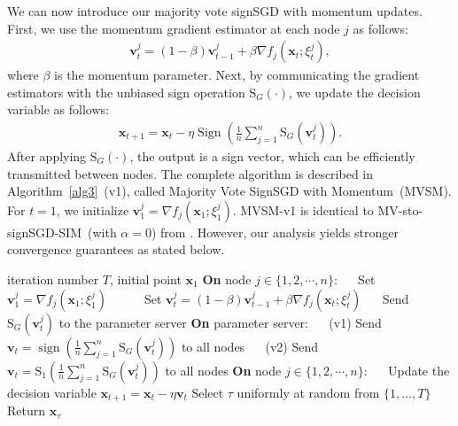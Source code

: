 \documentclass{article}
\def \v {\mathbf{v}}
\def \x {\mathbf{x}}
\def \x {\mathbf{x}}
\def \v {\mathbf{v}}
\begin{document}
We can now introduce our majority vote signSGD with momentum updates. First, we use the momentum gradient estimator at each node $j$ as follows:
\begin{align}
    \v_t^j = (1-\beta) \v_{t-1}^j + \beta \nabla f_j(\x_t;\xi_t^{j}),
\end{align}
where $\beta$ is the momentum parameter. Next, by communicating the gradient estimators with the unbiased sign operation $\operatorname{S_\textit{G}}(\cdot)$, we update the decision variable as follows:
\begin{align}
    \x_{t+1} = \x_t - \eta \operatorname{Sign}\left(\frac{1}{n} \sum_{j=1}^{n} \operatorname{S_\textit{G}}(\v_t^j) \right).
\end{align} 
After applying $\operatorname{S_\textit{G}}(\cdot)$, the output is a sign vector, which can be efficiently transmitted between nodes. The complete algorithm is described in Algorithm~\ref{alg3}~(v1), called Majority Vote SignSGD with Momentum~(MVSM). For $t = 1$, we initialize $\v_1^j = \nabla f_j(\x_1; \xi_1^j)$. MVSM-v1 is identical to MV-sto-signSGD-SIM~(with $\alpha =0$) from \cite{pmlr-v202-sun23l}. However, our analysis yields stronger convergence guarantees as stated below.
\begin{algorithm}[!t]
	\caption{Majority vote signSGD with momentum~(MVSM)}
	\label{alg3}
	\begin{algorithmic}[1]
    \renewcommand{\algorithmicif}{\hspace{1.3em}\textbf{if}}
\renewcommand{\algorithmicelse}{\hspace{1.3em}\textbf{else}}
\renewcommand{\algorithmicendif}{\hspace{1.3em}\textbf{end if}}
	 iteration number $T$, initial point $\x_1$
        \STATE \textbf{On} node $j \in \{1,2,\cdots,n\}$:
        \STATE $\quad$ Set $\v_1^j=\nabla f_j(\x_1;\xi_1^j)$
        $\quad$ \ELSE
        \STATE $\quad$ Set $\v_t^j=(1-\beta)\v_{t-1}^j+\beta\nabla f_j(\x_t;\xi_t^j)$
        \ENDIF
        \STATE $\quad$  Send $\operatorname{S_\textit{G}}(\v_t^j)$ to the parameter server
        \STATE \textbf{On} parameter server: 
        \STATE $\quad$ (v1) Send $\v_t = \operatorname{sign}\left( \frac{1}{n}\sum_{j=1}^n \operatorname{S_\textit{G}}\left(\v_t^j\right)\right)$ to all nodes  
        \STATE $\quad$ (v2) Send $\v_t = \operatorname{S_1}\left( \frac{1}{n}\sum_{j=1}^n \operatorname{S_\textit{G}}\left(\v_t^j\right)\right)$ to all nodes
        \STATE \textbf{On} node $j \in \{1,2,\cdots,n\}$:
        \STATE $\quad$ Update the decision variable $\x_{t+1} = \x_t - \eta \v_t$
		\ENDFOR
	\STATE Select $\tau$ uniformly at random from $\{1, \ldots, T\}$
	\STATE Return $\x_\tau$
	\end{algorithmic}
\end{algorithm}
\end{document}
